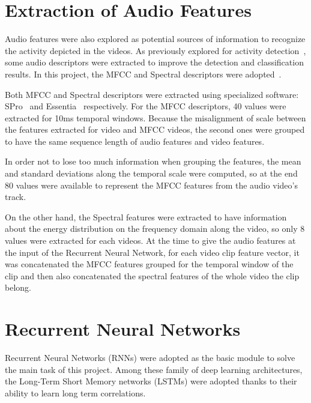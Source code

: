 \section{Extraction of Audio Features}

Audio features were also explored as potential sources of information to recognize the activity depicted in the videos. As previously explored for activity detection~\cite{xu2015uts}, some audio descriptors were extracted to improve the detection and classification results. In this project, the MFCC and Spectral descriptors were adopted~\cite{heittola2013context}.

Both MFCC and Spectral descriptors were extracted using specialized software: SPro~\cite{gravier2010spro} and Essentia~\cite{bogdanov2013essentia} respectively. For the MFCC descriptors, 40 values were extracted for 10ms temporal windows. Because the misalignment of scale between the features extracted for video and MFCC videos, the second ones were grouped to have the same sequence length of audio features and video features.

In order not to lose too much information when grouping the features, the mean and standard deviations along the temporal scale were computed, so at the end 80 values were available to represent the MFCC features from the audio video's track.

On the other hand, the Spectral features were extracted to have information about the energy distribution on the frequency domain along the video, so only 8 values were extracted for each videos. At the time to give the audio features at the input of the Recurrent Neural Network, for each video clip feature vector, it was concatenated the MFCC features grouped for the temporal window of the clip and then also concatenated the spectral features of the whole video the clip belong.

\section{Recurrent Neural Networks}

Recurrent Neural Networks (RNNs) were adopted as the basic module to solve the main task of this project. Among these family of deep learning architectures, the Long-Term Short Memory networks (LSTMs) were adopted thanks to their ability to learn long term correlations. %

